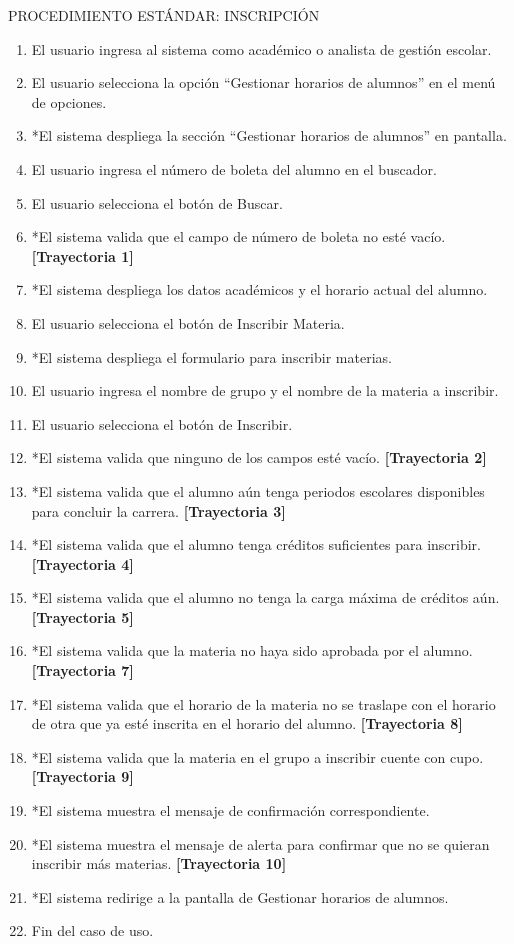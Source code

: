 \vspace*{1cm}
\noindent
\Large{PROCEDIMIENTO ESTÁNDAR: INSCRIPCIÓN}
\large{}
\begin{enumerate}
    \item El usuario ingresa al sistema como académico o analista de gestión escolar.
    \item El usuario selecciona la opción “Gestionar horarios de alumnos” en el menú de opciones.
    \item *El sistema despliega la sección “Gestionar horarios de alumnos” en pantalla.
    \item El usuario ingresa el número de boleta del alumno en el buscador.
    \item El usuario selecciona el botón de Buscar.
    \item *El sistema valida que el campo de número de boleta no esté vacío. \textbf{[Trayectoria 1]}
    \item *El sistema despliega los datos académicos y el horario actual del alumno.
    \item El usuario selecciona el botón de Inscribir Materia.
    \item *El sistema despliega el formulario para inscribir materias.
    \item El usuario ingresa el nombre de grupo y el nombre de la materia a inscribir.
    \item El usuario selecciona el botón de Inscribir.
    \item *El sistema valida que ninguno de los campos esté vacío. \textbf{[Trayectoria 2]}
    \item *El sistema valida que el alumno aún tenga periodos escolares disponibles para concluir la carrera. \textbf{[Trayectoria 3]}
    \item *El sistema valida que el alumno tenga créditos suficientes para inscribir. \textbf{[Trayectoria 4]}
    \item *El sistema valida que el alumno no tenga la carga máxima de créditos aún. \textbf{[Trayectoria 5]}
    \item *El sistema valida que la materia no haya sido aprobada por el alumno. \textbf{[Trayectoria 7]}
    \item *El sistema valida que el horario de la materia no se traslape con el horario de otra que ya esté inscrita en el horario del alumno. \textbf{[Trayectoria 8]}
    \item *El sistema valida que la materia en el grupo a inscribir cuente con cupo. \textbf{[Trayectoria 9]}
    \item *El sistema muestra el mensaje de confirmación correspondiente.
    \item *El sistema muestra el mensaje de alerta para confirmar que no se quieran inscribir más materias. \textbf{[Trayectoria 10]}
    \item *El sistema redirige a la pantalla de Gestionar horarios de alumnos.
    \item Fin del caso de uso.
\end{enumerate}
